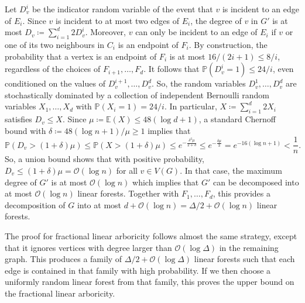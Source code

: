\documentclass[11pt]{article}
\makeatletter
\theoremstyle{plain}
\theoremstyle{definition}
\renewenvironment{proof}[1][\proofname]
{\par\pushQED{\qed}
	\normalfont\topsep6\p@\@plus6\p@\relax\trivlist
	\item[\hskip\labelsep\bfseries#1\@addpunct{.}]
	\ignorespaces}
{\popQED\endtrivlist\@endpefalse}
\newcommand{\pr}{\mathbb{P}}
\newcommand{\ev}{\mathbb{E}}
\newcommand{\cO}{\mathcal O}
\makeatother
\begin{document}
\begin{proof}[Proof of \cref{thm:lineararboricitylogerror}]
    Let $D_v^i$ be the indicator random variable of the event that $v$ is incident to an edge of $E_i$. Since $v$ is incident to at most two edges of $E_i$, the degree of $v$ in $G'$ is at most $D_v \coloneqq \sum_{i=1}^d 2 D_v^i$. Moreover, $v$ can only be incident to an edge of $E_i$ if $v$ or one of its two neighbours in $C_i$ is an endpoint of $F_i$. By construction, the probability that a vertex is an endpoint of $F_i$ is at most $16/(2i+1) \le 8/i$, regardless of the choices of $F_{i+1}, \dots, F_d$. It follows that $\pr(D_v^i = 1) \le 24/i$, even conditioned on the values of $D_v^{i+1}, \dots, D_v^d$. So, the random variables $D_v^1, \dots, D_v^d$ are stochastically dominated by a collection of independent Bernoulli random variables $X_1, \dots, X_d$ with $\pr(X_i = 1) = 24/i$. In particular, $X \coloneqq \sum_{i=1}^d 2 X_i$ satisfies $D_v \le X$. Since $\mu \coloneqq \ev(X) \le 48 (\log d + 1)$, a standard Chernoff bound with $\delta \coloneqq 48 (\log n + 1) / \mu \ge 1$ implies that
    \[
        \pr(D_v > (1 + \delta) \mu) \le \pr(X > (1 + \delta) \mu) \le e^{-\frac{\delta^2 \mu}{2 + \delta}} \le e^{-\frac{\delta \mu}{3}} = e^{-16 (\log n + 1)} < \frac{1}{n}.
    \]
    So, a union bound shows that with positive probability, $D_v \le (1 + \delta) \mu = \cO(\log n)$ for all $v \in V(G)$. In that case, the maximum degree of $G'$ is at most $\cO(\log n)$ which implies that $G'$ can be decomposed into at most $\cO(\log n)$ linear forests. Together with $F_1, \dots, F_d$, this provides a decomposition of $G$ into at most $d + \cO(\log n) = \Delta/2 + \cO(\log n)$ linear forests.
\end{proof}

The proof for fractional linear arboricity follows almost the same strategy, except that it ignores vertices with degree larger than $\cO(\log \Delta)$ in the remaining graph. This produces a family of $\Delta/2 + \cO(\log \Delta)$ linear forests such that each edge is contained in that family with high probability. If we then choose a uniformly random linear forest from that family, this proves the upper bound on the fractional linear arboricity.
\end{document}
